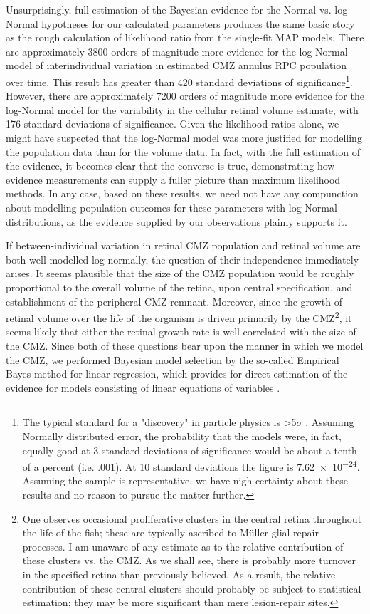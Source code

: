 Unsurprisingly, full estimation of the Bayesian evidence for the Normal vs. log-Normal hypotheses for our calculated parameters produces the same basic story as the rough calculation of likelihood ratio from the single-fit MAP models. There are approximately 3800 orders of magnitude more evidence for the log-Normal model of interindividual variation in estimated CMZ annulus RPC population over time. This result has greater than 420 standard deviations of significance\footnote{The typical standard for a "discovery" in particle physics is >5$\sigma$ \cite{Lyons2013}. Assuming Normally distributed error, the probability that the models were, in fact, equally good at 3 standard deviations of significance would be about a tenth of a percent (i.e. .001). At 10 standard deviations the figure is \num{7.62e-24}. Assuming the sample is representative, we have nigh certainty about these results and no reason to pursue the matter further.}. However, there are approximately 7200 orders of magnitude more evidence for the log-Normal model for the variability in the cellular retinal volume estimate, with 176 standard deviations of significance. Given the likelihood ratios alone, we might have suspected that the log-Normal model was more justified for modelling the population data than for the volume data. In fact, with the full estimation of the evidence, it becomes clear that the converse is true, demonstrating how evidence measurements can supply a fuller picture than maximum likelihood methods. In any case, based on these results, we need not have any compunction about modelling population outcomes for these parameters with log-Normal distributions, as the evidence supplied by our observations plainly supports it.

If between-individual variation in retinal CMZ population and retinal volume are both well-modelled log-normally, the question of their independence immediately arises. It seems plausible that the size of the CMZ population would be roughly proportional to the overall volume of the retina, upon central specification, and establishment of the peripheral CMZ remnant. Moreover, since the growth of retinal volume over the life of the organism is driven primarily by the CMZ\footnote{One observes occasional proliferative clusters in the central retina throughout the life of the fish; these are typically ascribed to M\"{u}ller glial repair processes. I am unaware of any estimate as to the relative contribution of these clusters vs. the CMZ. As we shall see, there is probably more turnover in the specified retina than previously believed. As a result, the relative contribution of these central clusters should probably be subject to statistical estimation; they may be more significant than mere lesion-repair sites.}, it seems likely that either the retinal growth rate is well correlated with the size of the CMZ. Since both of these questions bear upon the manner in which we model the CMZ, we performed Bayesian model selection by the so-called Empirical Bayes method for linear regression, which provides for direct estimation of the evidence for models consisting of linear equations of variables \cite{Bishop2006}.

